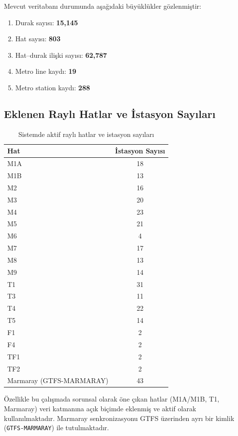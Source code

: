 Mevcut veritabanı durumunda aşağıdaki büyüklükler gözlenmiştir:
\begin{enumerate}
    \item Durak sayısı: \textbf{15{,}145}
    \item Hat sayısı: \textbf{803}
    \item Hat--durak ilişki sayısı: \textbf{62{,}787}
    \item Metro line kaydı: \textbf{19}
    \item Metro station kaydı: \textbf{288}
\end{enumerate}

\subsection{Eklenen Raylı Hatlar ve İstasyon Sayıları}

\begin{table}[h]
\centering
\caption{Sistemde aktif raylı hatlar ve istasyon sayıları}
\begin{tabular}{|l|c|}
\hline
\textbf{Hat} & \textbf{İstasyon Sayısı} \\
\hline
M1A & 18 \\
M1B & 13 \\
M2 & 16 \\
M3 & 20 \\
M4 & 23 \\
M5 & 21 \\
M6 & 4 \\
M7 & 17 \\
M8 & 13 \\
M9 & 14 \\
T1 & 31 \\
T3 & 11 \\
T4 & 22 \\
T5 & 14 \\
F1 & 2 \\
F4 & 2 \\
TF1 & 2 \\
TF2 & 2 \\
Marmaray (GTFS-MARMARAY) & 43 \\
\hline
\end{tabular}
\end{table}

Özellikle bu çalışmada sorunsal olarak öne çıkan hatlar (M1A/M1B, T1, Marmaray) veri katmanına açık biçimde eklenmiş ve aktif olarak kullanılmaktadır. Marmaray senkronizasyonu GTFS üzerinden ayrı bir kimlik (\texttt{GTFS-MARMARAY}) ile tutulmaktadır.

